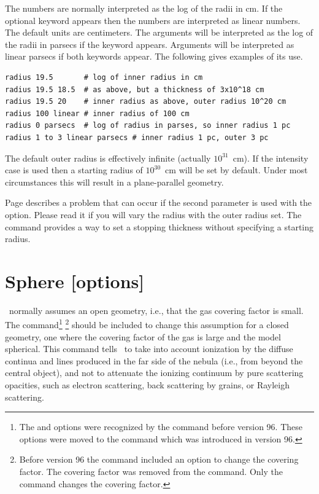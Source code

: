 The numbers are normally interpreted as the log of the radii in cm.
If the optional keyword  appears then
the numbers are interpreted
as linear numbers.
The default units are centimeters.
The arguments will
be interpreted as the log of the radii in parsecs if the keyword
 appears.
Arguments will be interpreted as linear parsecs if both keywords
appear.
The following gives examples of its use.
\begin{verbatim}
radius 19.5       # log of inner radius in cm
radius 19.5 18.5  # as above, but a thickness of 3x10^18 cm
radius 19.5 20    # inner radius as above, outer radius 10^20 cm
radius 100 linear # inner radius of 100 cm
radius 0 parsecs  # log of radius in parses, so inner radius 1 pc
radius 1 to 3 linear parsecs # inner radius 1 pc, outer 3 pc
\end{verbatim}

The default outer radius is effectively infinite (actually $10^{31}$~cm).
If the intensity case is used then a starting radius of $10^{30}$~cm
will be set by default.
Under most circumstances this will result in a
plane-parallel geometry.

Page \pageref{sec:RadiusVaryOptions} describes a problem
that can occur if the second parameter is used with the
 option.
Please read it if you will vary the radius
with the outer radius set.
The  command provides a way to set
a stopping thickness without specifying a starting radius.

\section{Sphere [options]}
\label{sec:CommandSphere}

\Cloudy\ normally assumes an open geometry, i.e.,
that the gas covering factor is small.
The  command\footnote{The  and 
options were recognized by the  command before
version 96.  These options were moved to the  command which was
introduced in version 96.} \footnote{Before version 96 the  command included an option to change
the covering factor.  The covering factor was removed from the
command.  Only the  command changes the covering
factor.} should be included
to change this assumption for a closed geometry,
one where the covering factor of the gas is large and the model spherical.
This command tells \Cloudy\ to take into account ionization by the diffuse
continua and lines produced in the far side of the nebula
(i.e., from beyond the central object), and not to attenuate
the ionizing continuum by pure
scattering opacities, such as electron scattering,
back scattering by grains,
or Rayleigh scattering.

